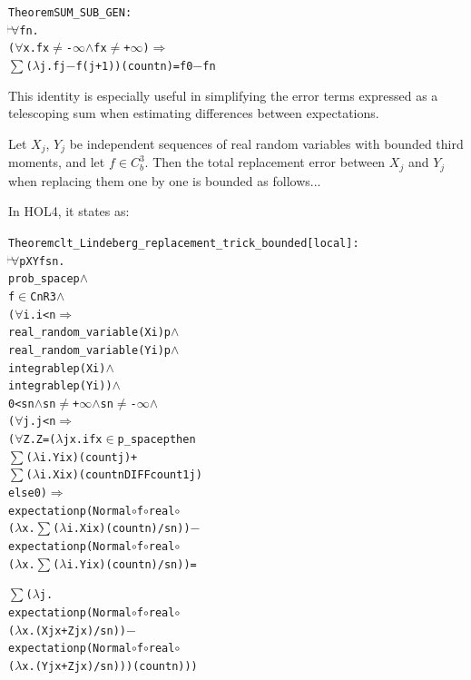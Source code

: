 \begin{hol}
\begin{alltt}
Theorem SUM\_SUB\_GEN :
\(\!\!\!{\turn}\!\!\!\!\) \(\forall\)f n.
(\(\forall\)x. f x \(\ne\) -\(\infty\) \(\land\) f x \(\ne\) +\(\infty\)) \(\Rightarrow\)
\(\sum\) (\(\lambda\)j. f j \({-}\) f (j + 1)) (count n) = f 0 \({-}\) f n
\end{alltt}
\end{hol}

This identity is especially useful in simplifying the error terms expressed as a telescoping sum when estimating differences between expectations.

\begin{theorem}
  \label{thm:lindeberg-replacement}
  Let $X_j$, $Y_j$ be independent sequences of real random variables with bounded third moments, and let $f \in C^3_b$. Then the total replacement error between $X_j$ and $Y_j$ when replacing them one by one is bounded as follows...
\end{theorem}

In HOL4, it states as:

\begin{hol}
\begin{alltt}
Theorem clt\_Lindeberg\_replacement\_trick\_bounded[local] :
\(\!\!\!{\turn}\!\!\!\!\) \(\forall\)p X Y f s n.
prob\_space p \(\land\)
f \(\in\) CnR 3 \(\land\)
(\(\forall\)i. i < n \(\Rightarrow\)
  real\_random\_variable (X i) p \(\land\)
  real\_random\_variable (Y i) p \(\land\)
  integrable p (X i) \(\land\)
  integrable p (Y i)) \(\land\)
0 < s n \(\land\) s n \(\ne\) +\(\infty\) \(\land\) s n \(\ne\) -\(\infty\) \(\land\)
(\(\forall\)j. j < n \(\Rightarrow\)
  (\(\forall\)Z. Z = (\(\lambda\)j x. if x \(\in\) p\_space p then
                      \(\sum\) (\(\lambda\)i. Y i x) (count j) +
                      \(\sum\) (\(\lambda\)i. X i x) (count n DIFF count1 j)
                   else 0) \(\Rightarrow\)
    expectation p (Normal \(\circ\) f \(\circ\) real \(\circ\)
                   (\(\lambda\)x. \(\sum\) (\(\lambda\)i. X i x) (count n) / s n)) \({-}\)
    expectation p (Normal \(\circ\) f \(\circ\) real \(\circ\)
                   (\(\lambda\)x. \(\sum\) (\(\lambda\)i. Y i x) (count n) / s n)) =

    \(\sum\) (\(\lambda\)j.
      expectation p (Normal \(\circ\) f \(\circ\) real \(\circ\)
                     (\(\lambda\)x. (X j x + Z j x) / s n)) \({-}\)
      expectation p (Normal \(\circ\) f \(\circ\) real \(\circ\)
                     (\(\lambda\)x. (Y j x + Z j x) / s n))) (count n)))
\end{alltt}
\end{hol}

